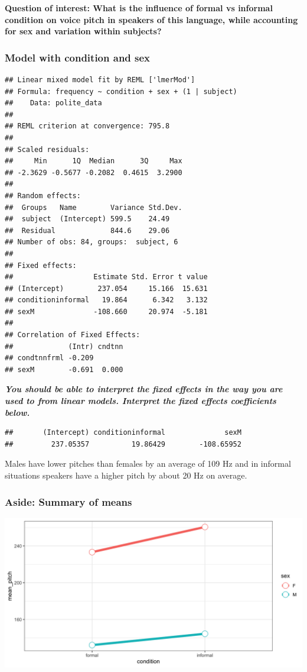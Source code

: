 \documentclass[
  openany]{book}
\begin{document}
\textbf{Question of interest: What is the influence of formal vs informal condition on voice pitch in speakers of this language, while accounting for sex and variation within subjects?}

\hypertarget{model-with-condition-and-sex}{%
\subsubsection{Model with condition and sex}\label{model-with-condition-and-sex}}

\begin{verbatim}
## Linear mixed model fit by REML ['lmerMod']
## Formula: frequency ~ condition + sex + (1 | subject)
##    Data: polite_data
## 
## REML criterion at convergence: 795.8
## 
## Scaled residuals: 
##     Min      1Q  Median      3Q     Max 
## -2.3629 -0.5677 -0.2082  0.4615  3.2900 
## 
## Random effects:
##  Groups   Name        Variance Std.Dev.
##  subject  (Intercept) 599.5    24.49   
##  Residual             844.6    29.06   
## Number of obs: 84, groups:  subject, 6
## 
## Fixed effects:
##                   Estimate Std. Error t value
## (Intercept)        237.054     15.166  15.631
## conditioninformal   19.864      6.342   3.132
## sexM              -108.660     20.974  -5.181
## 
## Correlation of Fixed Effects:
##             (Intr) cndtnn
## condtnnfrml -0.209       
## sexM        -0.691  0.000
\end{verbatim}

\textbf{\emph{You should be able to interpret the fixed effects in the way you are used to from linear models. Interpret the fixed effects coefficients below.}}

\begin{verbatim}
##       (Intercept) conditioninformal              sexM 
##         237.05357          19.86429        -108.65952
\end{verbatim}

Males have lower pitches than females by an average of 109 Hz and in informal situations speakers have a higher pitch by about 20 Hz on average.

\hypertarget{aside-summary-of-means}{%
\subsubsection{Aside: Summary of means}\label{aside-summary-of-means}}

\includegraphics[width=9.1\linewidth]{images/m3/aside}
\end{document}
